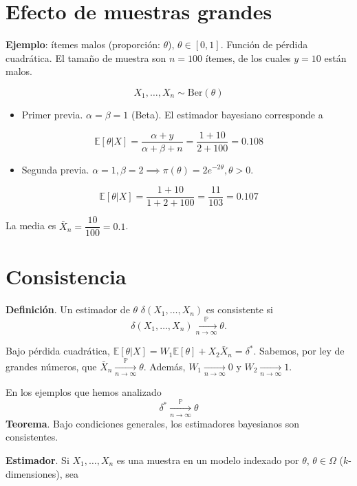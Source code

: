 \documentclass[
  12pt,
]{book}
\providecommand{\tightlist}{%
  \setlength{\itemsep}{0pt}\setlength{\parskip}{0pt}}
\begin{document}
\hypertarget{efecto-de-muestras-grandes}{%
\section{Efecto de muestras grandes}\label{efecto-de-muestras-grandes}}

\textbf{Ejemplo}: ítemes malos (proporción: \(\theta\)), \(\theta \in [0,1]\). Función de pérdida cuadrática. El tamaño de muestra son \(n=100\) ítemes, de los cuales \(y=10\) están malos.

\[ X_1,\dots,X_n\sim \text{Ber}(\theta)\]

\begin{itemize}
\tightlist
\item
  Primer previa. \(\alpha = \beta = 1\) (Beta). El estimador bayesiano corresponde a
\end{itemize}

\[ \mathbb{E}[\theta|X] = \dfrac{\alpha+y}{\alpha+\beta+n} = \dfrac{1+10}{2+100} = 0.108\]

\begin{itemize}
\tightlist
\item
  Segunda previa. \(\alpha =1, \beta=2 \implies \pi(\theta) = 2e^{-2\theta}, \theta >0\).
\end{itemize}

\[ \mathbb{E}[\theta|X] = \dfrac{1+10}{1+2+100} = \dfrac{11}{103}=0.107\]

La media es \(\bar X_n = \dfrac{10}{100} = 0.1\).

\hypertarget{consistencia}{%
\section{Consistencia}\label{consistencia}}

\textbf{Definición}. Un estimador de \(\theta\) \(\delta(X_1,\dots, X_n)\) es consistente si \[\delta(X_1,\dots, X_n)\xrightarrow[n\to \infty]{\mathbb{P}}\theta.\]

Bajo pérdida cuadrática, \(\mathbb{E}[\theta|X] = W_1\mathbb{E}[\theta] + X_2\bar X_n = \delta^*\). Sabemos, por ley de grandes números, que \(\bar X_n \xrightarrow[n\to \infty]{\mathbb{P}}\theta\). Además, \(W_1\xrightarrow[n\to \infty]{}0\) y \(W_2\xrightarrow[n\to \infty]{}1\).

En los ejemplos que hemos analizado
\[\delta^* \xrightarrow[n\to \infty]{\mathbb{P}}\theta \]
\textbf{Teorema}. Bajo condiciones generales, los estimadores bayesianos son consistentes.

\textbf{Estimador}. Si \(X_1,\dots, X_n\) es una muestra en un modelo indexado por \(\theta\), \(\theta \in \Omega\) (\(k\)-dimensiones), sea
\end{document}

